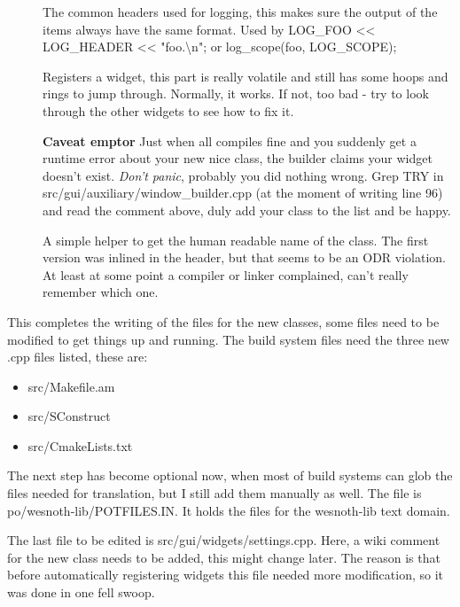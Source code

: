 \begin{description}
\begin{description}
\begin{description}
	\item[]
		The common headers used for logging, this makes sure the output of the
		items always have the same format. Used by
		LOG\_FOO \textless\textless{} LOG\_HEADER \textless\textless{} "foo.\textbackslash{}n"; or
		log\_scope(foo, LOG\_SCOPE); %

	\item[]
		Registers a widget, this part is really volatile and still has some
		hoops and rings to jump through. Normally, it works. If not, too bad -
		try to look through the other widgets to see how to fix it.

		\textbf{Caveat emptor} Just when all compiles fine and you suddenly get a runtime
		error about your new nice class, the builder claims your widget doesn't
		exist. \emph{Don't panic}, probably you did nothing wrong. Grep TRY in
		src/gui/auxiliary/window\_builder.cpp (at the moment of writing line 96)
		and read the comment above, duly add your class to the list and be
		happy.

	\item[]
		A simple helper to get the human readable name of the class. The first
		version was inlined in the header, but that seems to be an ODR
		violation. At least at some point a compiler or linker complained, can't
		really remember which one. %

	\end{description}
\end{description}

This completes the writing of the files for the new classes, some files need to
be modified to get things up and running. The build system files need the three
new .cpp files listed, these are:
\begin{itemize}
\item src/Makefile.am
\item src/SConstruct
\item src/CmakeLists.txt
\end{itemize}

The next step has become optional now, when most of build systems can glob the files
needed for translation, but I still add them manually as well. The file is
po/wesnoth-lib/POTFILES.IN. It holds the files for the wesnoth-lib text
domain.

The last file to be edited is src/gui/widgets/settings.cpp. Here, a wiki comment
for the new class needs to be added, this might change later. The reason is that
before automatically registering widgets this file needed more modification, so
it was done in one fell swoop.

\end{description}

